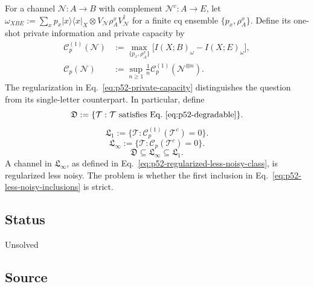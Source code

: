 For a channel $\mathcal N:A\to B$ with complement $\mathcal N^c:A\to E$,
let
$\omega_{XBE}:=\sum_x p_x\lvert x\rangle\!\langle x\rvert_X\otimes
V_{\mathcal N}\rho_A^xV_{\mathcal N}^\dagger$ for a finite cq ensemble
$\{p_x,\rho_A^x\}$.  Define its one-shot private information and private
capacity by
\begin{equation}
  \begin{aligned}
    \mathcal C_p^{(1)}(\mathcal N)
      &:=\max_{\{p_x,\rho_A^x\}}
          \bigl[I(X;B)_\omega-I(X;E)_\omega\bigr],\\
    \mathcal C_p(\mathcal N)
      &:=\sup_{n\ge1}\frac1n
          \mathcal C_p^{(1)}(\mathcal N^{\otimes n}).
  \end{aligned}
  \label{eq:p52-private-capacity}
\end{equation}
The regularization in Eq.~\eqref{eq:p52-private-capacity} distinguishes the
question from its single-letter counterpart.  In particular, define
\begin{equation}
  \mathfrak D
    :=\{\mathcal T:\mathcal T\text{ satisfies
        Eq.~\eqref{eq:p52-degradable}}\}.
  \label{eq:p52-degradable-class}
\end{equation}
\begin{equation}
  \mathfrak L_1
    :=\{\mathcal T:\mathcal C_p^{(1)}(\mathcal T^c)=0\}.
  \label{eq:p52-one-shot-less-noisy-class}
\end{equation}
\begin{equation}
  \mathfrak L_\infty
    :=\{\mathcal T:\mathcal C_p(\mathcal T^c)=0\}.
  \label{eq:p52-regularized-less-noisy-class}
\end{equation}
\begin{equation}
  \mathfrak D\subseteq\mathfrak L_\infty\subseteq\mathfrak L_1.
  \label{eq:p52-less-noisy-inclusions}
\end{equation}
A channel in $\mathfrak L_\infty$, as defined in
Eq.~\eqref{eq:p52-regularized-less-noisy-class}, is regularized less noisy.
The problem is whether the first inclusion in
Eq.~\eqref{eq:p52-less-noisy-inclusions} is strict.

\subsection*{Status}

Unsolved

\subsection*{Source}

